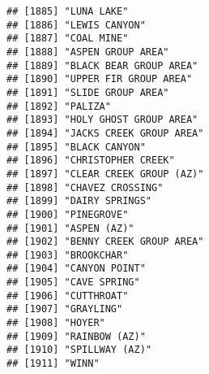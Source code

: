 \documentclass[
]{article}
\begin{document}
\begin{verbatim}
## [1885] "LUNA LAKE"                                                                           
## [1886] "LEWIS CANYON"                                                                        
## [1887] "COAL MINE"                                                                           
## [1888] "ASPEN GROUP AREA"                                                                    
## [1889] "BLACK BEAR GROUP AREA"                                                               
## [1890] "UPPER FIR GROUP AREA"                                                                
## [1891] "SLIDE GROUP AREA"                                                                    
## [1892] "PALIZA"                                                                              
## [1893] "HOLY GHOST GROUP AREA"                                                               
## [1894] "JACKS CREEK GROUP AREA"                                                              
## [1895] "BLACK CANYON"                                                                        
## [1896] "CHRISTOPHER CREEK"                                                                   
## [1897] "CLEAR CREEK GROUP (AZ)"                                                              
## [1898] "CHAVEZ CROSSING"                                                                     
## [1899] "DAIRY SPRINGS"                                                                       
## [1900] "PINEGROVE"                                                                           
## [1901] "ASPEN (AZ)"                                                                          
## [1902] "BENNY CREEK GROUP AREA"                                                              
## [1903] "BROOKCHAR"                                                                           
## [1904] "CANYON POINT"                                                                        
## [1905] "CAVE SPRING"                                                                         
## [1906] "CUTTHROAT"                                                                           
## [1907] "GRAYLING"                                                                            
## [1908] "HOYER"                                                                               
## [1909] "RAINBOW (AZ)"                                                                        
## [1910] "SPILLWAY (AZ)"                                                                       
## [1911] "WINN"                                                                                

\end{verbatim}
\end{document}

